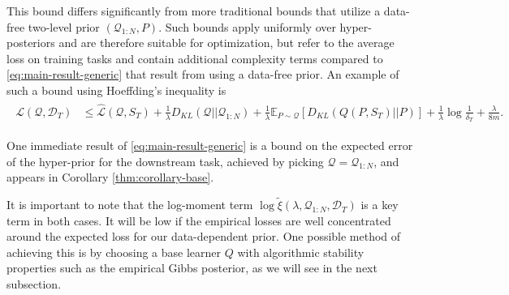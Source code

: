 \documentclass{article} %
\theoremstyle{definition}
\newcommand{\Expect}[2]{\mathbb{E}_{#1}\left [#2 \right ]}
\begin{document}
This bound differs significantly from more traditional bounds that utilize a data-free two-level prior $(\mathcal{Q}_{1:N}, P)$. Such bounds apply uniformly over hyper-posteriors and are therefore suitable for optimization, but refer to the average loss on training tasks and contain additional complexity terms compared to \eqref{eq:main-result-generic} that result from using a data-free prior. An example of such a bound using Hoeffding's inequality is 
%
\begin{align} \label{eq:main-result-generic-datafree}
\begin{split}
\mathcal{L}(\mathcal{Q}, \mathcal{D}_T) &\leq \hat{\mathcal{L}}(\mathcal{Q}, S_T) 
+ \frac{1}{\lambda}D_{KL}(\mathcal{Q}||\mathcal{Q}_{1:N}) 
+ \frac{1}{\lambda}\Expect{P\sim \mathcal{Q}}{D_{KL}(Q(P,S_T)||P)}
+\frac{1}{\lambda}\log\frac{1}{\delta_T}+\frac{\lambda}{8m} .
\end{split}
\end{align}


One immediate result of \eqref{eq:main-result-generic} is a bound on the expected error of the hyper-prior for the downstream task, achieved by picking $\mathcal{Q}=\mathcal{Q}_{1:N}$, and appears in Corollary \ref{thm:corollary-base}.

It is important to note that the log-moment term $\log\tilde{\xi}(\lambda,\mathcal{Q}_{1:N},\mathcal{D}_T)$ is a key term in both cases. It will be low if the empirical losses are well concentrated around the expected loss for our data-dependent prior. One possible method of achieving this is by choosing a base learner $Q$ with algorithmic stability properties such as the empirical Gibbs posterior, as we will see in the next subsection.

\end{document}
